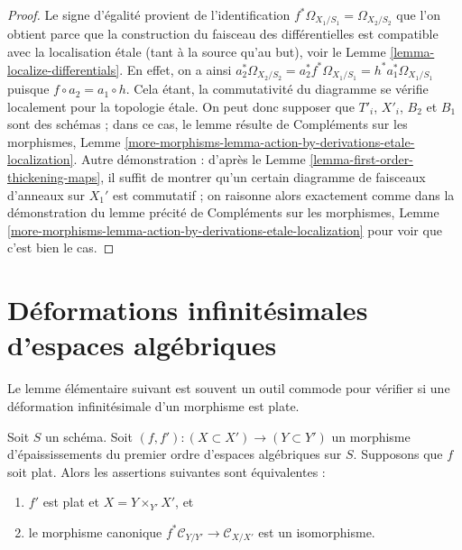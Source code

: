 \begin{proof}
Le signe d'égalité provient de l'identification
$f^*\Omega_{X_1/S_1} = \Omega_{X_2/S_2}$ que l'on obtient
parce que la construction du faisceau des différentielles est
compatible avec la localisation étale (tant à la source qu'au but), voir le
Lemme \ref{lemma-localize-differentials}.
En effet, on a ainsi
$a_2^*\Omega_{X_2/S_2} = a_2^*f^*\Omega_{X_1/S_1} =
h^*a_1^*\Omega_{X_1/S_1}$ puisque $f \circ a_2 = a_1 \circ h$.
Cela étant, la commutativité du diagramme se vérifie
localement pour la topologie étale. On peut donc supposer que $T'_i$, $X'_i$,
$B_2$ et $B_1$ sont des schémas ; dans ce cas, le lemme
résulte de
Compléments sur les morphismes, Lemme
\ref{more-morphisms-lemma-action-by-derivations-etale-localization}.
Autre démonstration : d'après le Lemme \ref{lemma-first-order-thickening-maps},
il suffit de montrer qu'un certain diagramme de faisceaux
d'anneaux sur $X_1'$ est commutatif ; on raisonne alors exactement
comme dans la démonstration du lemme précité de
Compléments sur les morphismes, Lemme
\ref{more-morphisms-lemma-action-by-derivations-etale-localization}
pour voir que c'est bien le cas.
\end{proof}










\section{Déformations infinitésimales d'espaces algébriques}
\label{section-deform}

\noindent
Le lemme élémentaire suivant est souvent un outil commode pour vérifier si
une déformation infinitésimale d'un morphisme est plate.

\begin{lemma}
\label{lemma-deform}
Soit $S$ un schéma. Soit $(f, f') : (X \subset X') \to (Y \subset Y')$ un
morphisme d'épaississements du premier ordre d'espaces algébriques sur $S$. Supposons que
$f$ soit plat. Alors les assertions suivantes sont équivalentes :
\begin{enumerate}
\item $f'$ est plat et $X = Y \times_{Y'} X'$, et
\item le morphisme canonique $f^*\mathcal{C}_{Y/Y'} \to \mathcal{C}_{X/X'}$
est un isomorphisme.
\end{enumerate}
\end{lemma}

